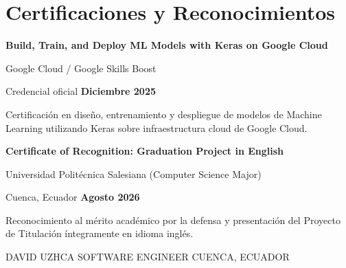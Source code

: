 \documentclass[10pt,a4paper]{article}
\begin{document}
\section{Certificaciones y Reconocimientos}

\begin{tcolorbox}[
    enhanced,
    colback=lightblue,
    colframe=lightblue,
    boxrule=0pt,
    arc=2mm,
    left=4mm,
    right=4mm,
    top=3mm,
    bottom=3mm
]
    {\large\bfseries\color{navy}
    Build, Train, and Deploy ML Models with Keras on Google Cloud}

    \vspace{2pt}

    {\normalsize Google Cloud / Google Skills Boost}

    {\small\color{muted}
    Credencial oficial
    \hfill
    \textbf{Diciembre 2025}}

    \vspace{3pt}
    \footnotesize
    Certificación en diseño, entrenamiento y despliegue de modelos de Machine Learning utilizando Keras sobre infraestructura cloud de Google Cloud.
\end{tcolorbox}

\vspace{4pt}

\begin{tcolorbox}[
    enhanced,
    colback=lightblue,
    colframe=lightblue,
    boxrule=0pt,
    arc=2mm,
    left=4mm,
    right=4mm,
    top=3mm,
    bottom=3mm
]
    {\large\bfseries\color{navy}
    Certificate of Recognition: Graduation Project in English}

    \vspace{2pt}

    {\normalsize Universidad Politécnica Salesiana (Computer Science Major)}

    {\small\color{muted}
    Cuenca, Ecuador
    \hfill
    \textbf{Agosto 2026}}

    \vspace{3pt}
    \footnotesize
    Reconocimiento al mérito académico por la defensa y presentación del Proyecto de Titulación íntegramente en idioma inglés.
\end{tcolorbox}

\vfill

\begin{center}
    {\footnotesize\color{muted}
    DAVID UZHCA
    \quad\textcolor{blue}{\textbullet}\quad
    SOFTWARE ENGINEER
    \quad\textcolor{blue}{\textbullet}\quad
    CUENCA, ECUADOR}
\end{center}
\end{document}
